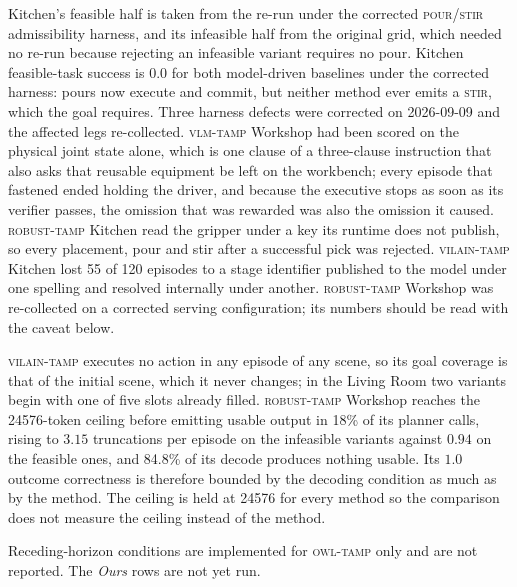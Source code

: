 \begin{table}[t]
\begin{minipage}{0.98\textwidth}
Kitchen's feasible half is taken from the re-run under the corrected
\textsc{pour}/\textsc{stir} admissibility harness, and its infeasible half from
the original grid, which needed no re-run because rejecting an infeasible
variant requires no pour. Kitchen feasible-task success is $0.0$ for both
model-driven baselines under the corrected harness: pours now execute and
commit, but neither method ever emits a \textsc{stir}, which the goal requires.
Three harness defects were corrected on 2026-09-09 and the affected legs
re-collected. \textsc{vlm-tamp} Workshop had been scored on the physical joint
state alone, which is one clause of a three-clause instruction that also asks
that reusable equipment be left on the workbench; every episode that fastened
ended holding the driver, and because the executive stops as soon as its
verifier passes, the omission that was rewarded was also the omission it
caused. \textsc{robust-tamp} Kitchen read the gripper under a key its runtime
does not publish, so every placement, pour and stir after a successful pick was
rejected. \textsc{vilain-tamp} Kitchen lost 55 of 120 episodes to a stage
identifier published to the model under one spelling and resolved internally
under another. \textsc{robust-tamp} Workshop was re-collected on a
corrected serving configuration; its numbers should be read with the caveat
below.

\textsc{vilain-tamp} executes no action in any episode of any scene, so its
goal coverage is that of the initial scene, which it never changes; in the
Living Room two variants begin with one of five slots already filled.
\textsc{robust-tamp} Workshop reaches the 24576-token ceiling before emitting
usable output in 18\% of its planner calls, rising to $3.15$ truncations per
episode on the infeasible variants against $0.94$ on the feasible ones, and
84.8\% of its decode produces nothing usable. Its $1.0$ outcome correctness is
therefore bounded by the decoding condition as much as by the method. The
ceiling is held at 24576 for every method so the comparison does not measure
the ceiling instead of the method.

Receding-horizon conditions are implemented for \textsc{owl-tamp} only and are
not reported. The \emph{Ours} rows are not yet run.
\end{minipage}

\end{table}
